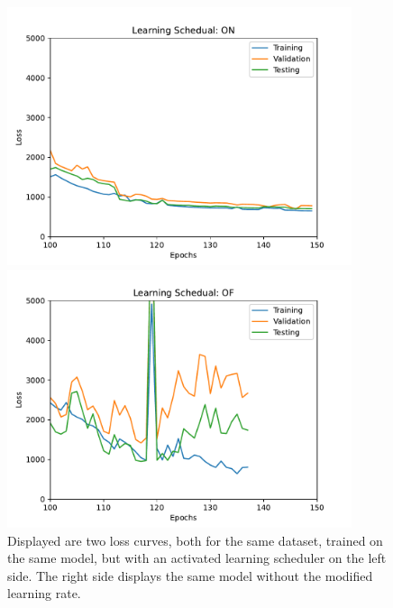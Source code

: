 \begin{figure}
\begin{minipage}{0.49\textwidth}
    \centering
    \includegraphics[width = 0.9\textwidth]{images/learning_on.pdf}
\end{minipage}
\begin{minipage}{0.49\textwidth}
    \centering
    \includegraphics[width = 0.9\textwidth]{images/learning_of.pdf}
\end{minipage}
    \caption{Displayed are two loss curves, both for the same dataset, trained on the same model, but with an activated learning scheduler on the left side. The right side displays the same model without the modified learning rate.}
    \label{fig:loss}
\end{figure}
\noindent
